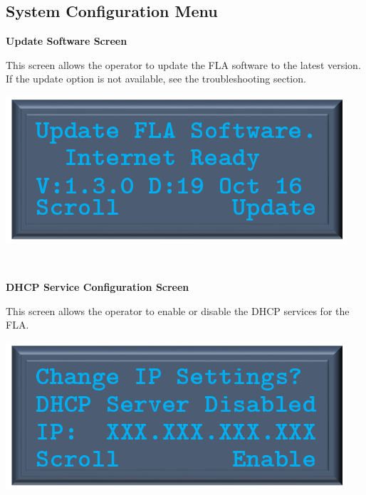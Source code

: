 \documentclass[11pt, oneside]{book}
\begin{document}
\subsection{System Configuration Menu}
\vspace{\baselineskip}
\noindent\begin{minipage}{0.45\textwidth}%
	\begin{center}
		\textbf{Update Software Screen}
	\end{center}
	This screen allows the operator to update the FLA software to the latest version.
	If the update option is not available, see the troubleshooting section.
\end{minipage}%
\hfill%
\begin{minipage}{0.45\textwidth} 
	\includegraphics[width=\linewidth]{../media/pstricks_files/07_update_fla_software}
\end{minipage}\\[\baselineskip]
\noindent\begin{minipage}{0.45\textwidth}%
	\begin{center}
		\textbf{DHCP Service Configuration Screen}
	\end{center}
	This screen allows the operator to enable or disable the DHCP services for the FLA.
\end{minipage}%
\hfill%
\begin{minipage}{0.45\textwidth} 
	\includegraphics[width=\linewidth]{../media/pstricks_files/08_change_ip_settings}
\end{minipage}\\[\baselineskip]
\end{document}
